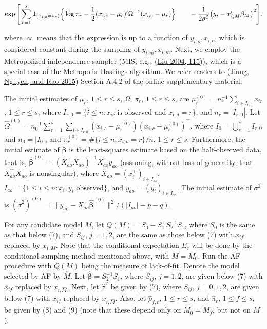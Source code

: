 \documentclass[
  12pt,
]{article}
\begin{document}
\begin{equation*} 
\exp \Bigg[
\sum_{r=1}^{s} \mathbf{1}_{(x_{i,d}=v_r)}
\Big\{
\log \pi_r
- \frac{1}{2} (x_{i,c} - \mu_r)' \Omega^{-1} (x_{i,c} - \mu_r)
\Big\} \\
\qquad
- \frac{1}{2\sigma^2} \big( y_i - x_{i,M}' \beta_M \big)^2
\Bigg].
\end{equation*}

where \(\propto\) means that the expression is up to a function of
\(y_{i,o}, x_{i,o}\), which is considered constant during the sampling
of \(y_{i,m}, x_{i,m}\). Next, we employ the Metropolized independence
sampler (MIS; e.g., (\protect\hyperlink{ref-Liu2004MonteCarlo}{Liu 2004,
115})), which is a special case of the Metropolis--Hastings algorithm.
We refer readers to (\protect\hyperlink{ref-Sunilems}{Jiang, Nguyen,
and Rao 2015}) Section A.4.2 of the online supplementary material.

The initial estimates of \(\mu_r\), \(1 \le r \le s\), \(\Omega\),
\(\pi_r\), \(1 \le r \le s\), are
\(\mu_r^{(0)} = n_r^{-1} \sum_{i \in I_{r,0}} x_{ir}\),
\(1 \le r \le s\), where
\(I_{r,0} = \{ i \le n : x_{ir} \text{ is observed and } x_{i,d} = r \}\),
and \(n_r = |I_{r,0}|\). Let
\(\hat{\Omega}^{(0)} = n_0^{-1} \sum_{r=1}^s \sum_{i \in I_{r,0}} (x_{i,c} - \mu_r^{(0)})(x_{i,c} - \mu_r^{(0)})^\top\),
where \(I_0 = \bigcup_{r=1}^s I_{r,0}\) and \(n_0 = |I_0|\), and
\(\pi_r^{(0)} = \#\{ i \le n : x_{i,d} = r \} / n\), \(1 \le r \le s\).
Furthermore, the initial estimate of \(\boldsymbol{\beta}\) is the
least-squares estimate based on the half-observed data, that is,
\(\hat{\boldsymbol{\beta}}^{(0)} = (X_{ao}^\top X_{ao})^{-1} X_{ao}^\top y_{ao}\)
(assuming, without loss of generality, that \(X_{ao}^\top X_{ao}\) is
nonsingular), where \(X_{ao} = (x_i^\top)_{i \in I_{ao}}\),
\(I_{ao} = \{ 1 \le i \le n : x_i, y_i \text{ observed} \}\), and
\(y_{ao} = (y_i)_{i \in I_{ao}}\). The initial estimate of \(\sigma^2\)
is
\((\hat{\sigma}^2)^{(0)} = \| y_{ao} - X_{ao} \hat{\boldsymbol{\beta}}^{(0)} \|^2 / (|I_{ao}| - p - q)\).

For any candidate model \(M\), let
\(Q(M) = S_0 - S_1^\top S_2^{-1} S_1\), where \(S_0\) is the same as
that below (7), and \(S_{ij}\), \(j = 1, 2\), are the same as those
below (7) with \(x_{if}\) replaced by \(x_{i,M}\). Note that the
conditional expectation \(E_c\) will be done by the conditional sampling
method mentioned above, with \(M = M_0\). Run the AF procedure with
\(Q(M)\) being the measure of lack-of-fit. Denote the model selected by
AF by \(\hat{M}\). Let \(\hat{\boldsymbol{\beta}} = S_2^{-1} S_1\),
where \(S_{ij}\), \(j = 1, 2\), are given below (7) with \(x_{if}\)
replaced by \(x_{i,\hat{M}}\). Next, let \(\hat{\sigma}^2\) be given by
(7), where \(S_{ij}\), \(j = 0, 1, 2\), are given below (7) with
\(x_{if}\) replaced by \(x_{i,\hat{M}}\). Also, let
\(\hat{\rho}_{f,r}\), \(1 \le r \le s\), and \(\hat{\pi}_r\),
\(1 \le f \le s\), be given by (8) and (9) (note that these depend only
on \(M_0 = M_f\), but not on \(M\)).
\end{document}
